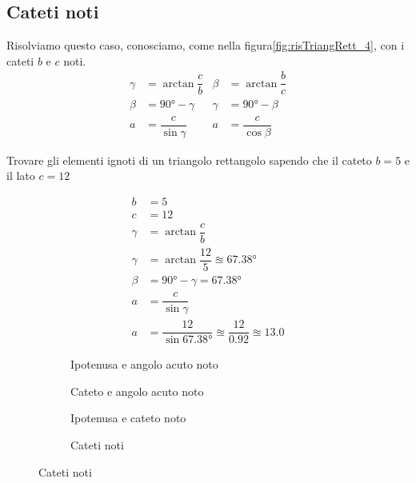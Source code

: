 \subsection{Cateti noti}
Risolviamo questo caso, conosciamo, come nella figura\nobs\vref*{fig:risTriangRett_4}, con i cateti $b$ e $c$ noti.
\begin{align*}
\gamma&=\arctan\dfrac{c}{b}&\beta&=\arctan\dfrac{b}{c}\\
\beta&=\ang{90}-\gamma&\gamma&=\ang{90}-\beta\\
a&=\dfrac{c}{\sin\gamma}&a&=\dfrac{c}{\cos\beta}
\end{align*}
\begin{esempiot}{}{}
Trovare gli elementi ignoti di un triangolo rettangolo sapendo che  il cateto $b=5$ e il lato $c=12$
\end{esempiot}
\begin{align*}
b&=5\\
c&=12\\
\gamma&=\arctan\dfrac{c}{b}\\
\gamma&=\arctan\dfrac{12}{5}\approxeq\ang{67.38}\\
\beta&=\ang{90}-\gamma=\ang{67.38}\\
a&=\dfrac{c}{\sin\gamma}\\
a&=\dfrac{12}{\sin\ang{67.38}}\approxeq\dfrac{12}{\num{0.92}}\approxeq\num{13.0}
\end{align*}
\begin{figure}
	\begin{subfigure}[b]{.5\linewidth}
		\centering

	\caption{Ipotenusa e angolo acuto noto}
	\label{fig:risTriangRett_1}
	\end{subfigure}%
	\begin{subfigure}[b]{.5\linewidth}
		\centering
		
		\caption{Cateto e angolo acuto noto}
		\label{fig:risTriangRett_2}
	\end{subfigure}
	\begin{subfigure}[b]{.5\linewidth}
		\centering
	
	\caption{Ipotenusa e cateto noto}
	\label{fig:risTriangRett_3}
	\end{subfigure}%
	\begin{subfigure}[b]{.5\linewidth}
		\centering
		
		\caption{Cateti noti}
		\label{fig:risTriangRett_4}
	\end{subfigure}
	\label{fig:RisoluzioneTriangoliRettangoli}
\end{figure}
